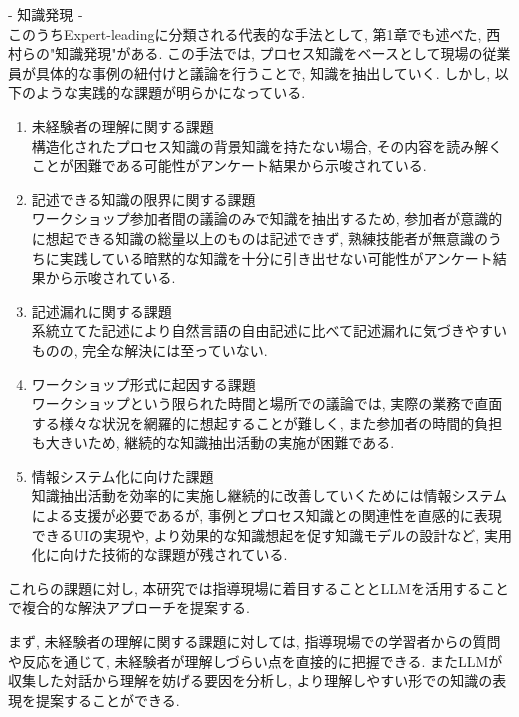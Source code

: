 - 知識発現 -\\
このうちExpert-leadingに分類される代表的な手法として, 第1章でも述べた, 西村らの"知識発現"\cite{Nishimura2017}がある. この手法では, プロセス知識をベースとして現場の従業員が具体的な事例の紐付けと議論を行うことで, 知識を抽出していく. しかし, 以下のような実践的な課題が明らかになっている.
\begin{enumerate}
    \item 未経験者の理解に関する課題\\
    構造化されたプロセス知識の背景知識を持たない場合, その内容を読み解くことが困難である可能性がアンケート結果から示唆されている.\\
    
    \item 記述できる知識の限界に関する課題\\
    ワークショップ参加者間の議論のみで知識を抽出するため, 参加者が意識的に想起できる知識の総量以上のものは記述できず, 熟練技能者が無意識のうちに実践している暗黙的な知識を十分に引き出せない可能性がアンケート結果から示唆されている.\\
    
    \item 記述漏れに関する課題\\
    系統立てた記述により自然言語の自由記述に比べて記述漏れに気づきやすいものの, 完全な解決には至っていない.\\
    
    \item ワークショップ形式に起因する課題\\
    ワークショップという限られた時間と場所での議論では, 実際の業務で直面する様々な状況を網羅的に想起することが難しく, また参加者の時間的負担も大きいため, 継続的な知識抽出活動の実施が困難である.\\
    
    \item 情報システム化に向けた課題\\
    知識抽出活動を効率的に実施し継続的に改善していくためには情報システムによる支援が必要であるが, 事例とプロセス知識との関連性を直感的に表現できるUIの実現や, より効果的な知識想起を促す知識モデルの設計など, 実用化に向けた技術的な課題が残されている.\\
\end{enumerate}

これらの課題に対し, 本研究では指導現場に着目することとLLMを活用することで複合的な解決アプローチを提案する. 

まず, 未経験者の理解に関する課題に対しては, 指導現場での学習者からの質問や反応を通じて, 未経験者が理解しづらい点を直接的に把握できる. またLLMが収集した対話から理解を妨げる要因を分析し, より理解しやすい形での知識の表現を提案することができる.

